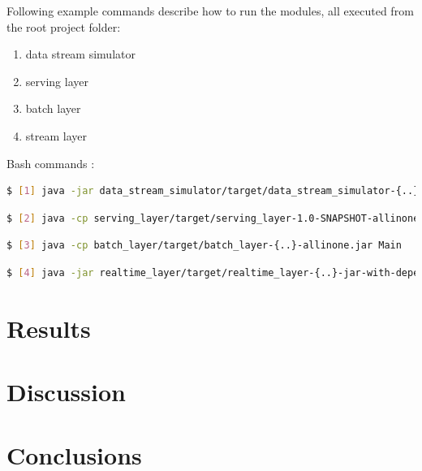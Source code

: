 \documentclass{lmproj}
\begin{document}
Following example commands describe how to run the modules, all executed from the root project folder:

\begin{enumerate}
	\item data stream simulator
	\item serving layer
	\item batch layer
	\item stream layer
\end{enumerate}

\noindent Bash commands :
\begin{lstlisting}[language=bash]
$ [1] java -jar data_stream_simulator/target/data_stream_simulator-{..}-jar-with-dependencies.jar -f {filepath to normalized dataset}
\end{lstlisting}

\begin{lstlisting}[language=bash]
$ [2] java -cp serving_layer/target/serving_layer-1.0-SNAPSHOT-allinone.jar {option -f with a given queries file}
\end{lstlisting}

\begin{lstlisting}[language=bash]
$ [3] java -cp batch_layer/target/batch_layer-{..}-allinone.jar Main
\end{lstlisting}

\begin{lstlisting}[language=bash]
$ [4] java -jar realtime_layer/target/realtime_layer-{..}-jar-with-dependencies.jar
\end{lstlisting}

\section{Results}
\label{evaluation}

\section{Discussion}
\label{evaluation}


\section{Conclusions}
\label{conclusions}




\end{document}
